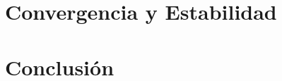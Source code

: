 \documentclass{article}
\theoremstyle{theorem-style}  %
\theoremstyle{definition}
\theoremstyle{example-style}
\begin{document}

\section{Convergencia y Estabilidad}


\section{Conclusión}



\printbibliography
\end{document}
